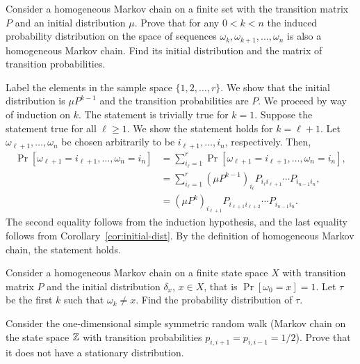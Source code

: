 \begin{problem}{2}
    Consider a homogeneous Markov chain on a finite set with the transition matrix $P$ and an initial distribution $\mu$. Prove that for any $0 < k < n$ the induced probability distribution on the space of sequences $\omega_k,\omega_{k+1},\ldots, \omega_n$ is also a homogeneous Markov chain. Find its initial distribution and the matrix of transition probabilities.
\end{problem}
\begin{solution}
    Label the elements in the sample space $\{1,2,\ldots,r\}$. We show that the initial distribution is $\mu P^{k-1}$ and the transition probabilities are $P$. We proceed by way of induction on $k$. The statement is trivially true for $k=1$. Suppose the statement true for all $\ell \geq 1$. We show the statement holds for $k=\ell+1$. Let $\omega_{\ell+1},\ldots,\omega_n$ be chosen arbitrarily to be $i_{\ell+1},\ldots,i_n$, respectively. Then, 
    \begin{align*}
        \Pr[\omega_{\ell+1}=i_{\ell+1},\ldots,\omega_n=i_n] &= \sum_{i_\ell = 1}^r \Pr[\omega_{\ell+1}=i_{\ell+1},\ldots,\omega_n=i_n], \\
        &= \sum_{i_\ell=1}^r \left(\mu P^{k-1}\right)_{i_\ell} P_{i_\ell i_{\ell+1}}\cdots P_{i_{n-1}i_n}, \\
        &= \left(\mu P^k\right)_{i_{\ell + 1}} P_{i_{\ell + 1}i_{\ell+2}}\cdots P_{i_{n-1}i_n}.  
    \end{align*}
    The second equality follows from the induction hypothesis, and the last equality follows from Corollary~\ref{cor:initial-dist}. By the definition of homogeneous Markov chain, the statement holds.
\end{solution}

\begin{problem}{3}
    Consider a homogeneous Markov chain on a finite state space $X$ with transition matrix $P$ and the initial distribution $\delta_x$, $x \in X$, that is $\Pr[\omega_0 = x] = 1$. Let $\tau$ be the first $k$ such that $\omega_k \neq x$. Find the probability distribution of $\tau$. 
\end{problem}
\begin{solution}
    
\end{solution}

\begin{problem}{4}
    Consider the one-dimensional simple symmetric random walk (Markov chain on the state space $\mathbb{Z}$ with transition probabilities $p_{i,i+1} = p_{i,i-1} = 1/2$). Prove that it does not have a stationary distribution.
\end{problem}
\begin{solution}
    
\end{solution}